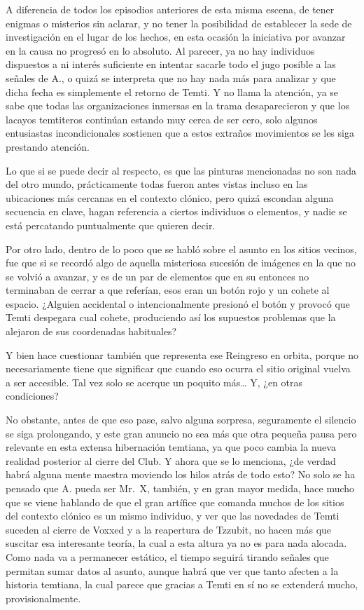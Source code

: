 \documentclass[
  spanish,
]{book}
\begin{document}
A diferencia de todos los episodios anteriores de esta misma escena, de tener enigmas o misterios sin aclarar, y no tener la posibilidad de establecer la sede de investigación en el lugar de los hechos, en esta ocasión la iniciativa por avanzar en la causa no progresó en lo absoluto. Al parecer, ya no hay individuos dispuestos a ni interés suficiente en intentar sacarle todo el jugo posible a las señales de A., o quizá se interpreta que no hay nada más para analizar y que dicha fecha es simplemente el retorno de Temti. Y no llama la atención, ya se sabe que todas las organizaciones inmersas en la trama desaparecieron y que los lacayos temtiteros continúan estando muy cerca de ser cero, solo algunos entusiastas incondicionales sostienen que a estos extraños movimientos se les siga prestando atención.

Lo que si se puede decir al respecto, es que las pinturas mencionadas no son nada del otro mundo, prácticamente todas fueron antes vistas incluso en las ubicaciones más cercanas en el contexto clónico, pero quizá escondan alguna secuencia en clave, hagan referencia a ciertos individuos o elementos, y nadie se está percatando puntualmente que quieren decir.

Por otro lado, dentro de lo poco que se habló sobre el asunto en los sitios vecinos, fue que si se recordó algo de aquella misteriosa sucesión de imágenes en la que no se volvió a avanzar, y es de un par de elementos que en su entonces no terminaban de cerrar a que referían, esos eran un botón rojo y un cohete al espacio. ¿Alguien accidental o intencionalmente presionó el botón y provocó que Temti despegara cual cohete, produciendo así los supuestos problemas que la alejaron de sus coordenadas habituales?

Y bien hace cuestionar también que representa ese Reingreso en orbita, porque no necesariamente tiene que significar que cuando eso ocurra el sitio original vuelva a ser accesible. Tal vez solo se acerque un poquito más\ldots{} Y, ¿en otras condiciones?

No obstante, antes de que eso pase, salvo alguna sorpresa, seguramente el silencio se siga prolongando, y este gran anuncio no sea más que otra pequeña pausa pero relevante en esta extensa hibernación temtiana, ya que poco cambia la nueva realidad posterior al cierre del Club. Y ahora que se lo menciona, ¿de verdad habrá alguna mente maestra moviendo los hilos atrás de todo esto? No solo se ha pensado que A. pueda ser Mr.~X, también, y en gran mayor medida, hace mucho que se viene hablando de que el gran artífice que comanda muchos de los sitios del contexto clónico es un mismo individuo, y ver que las novedades de Temti suceden al cierre de Voxxed y a la reapertura de Tzzubit, no hacen más que suscitar esa interesante teoría, la cual a esta altura ya no es para nada alocada. Como nada va a permanecer estático, el tiempo seguirá tirando señales que permitan sumar datos al asunto, aunque habrá que ver que tanto afecten a la historia temtiana, la cual parece que gracias a Temti en sí no se extenderá mucho, provisionalmente.
\end{document}
